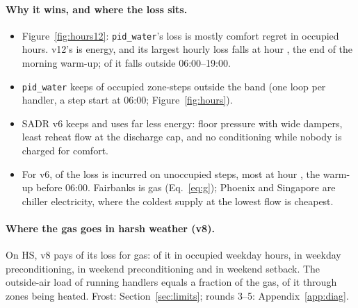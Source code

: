 \documentclass{article}
\begin{document}
\paragraph{Why it wins, and where the loss sits.}
\begin{itemize}
\item Figure~\ref{fig:hours12}: \texttt{pid\_water}'s loss is mostly comfort regret in occupied hours. v12's is energy, and its largest hourly loss falls at hour \RElvHourPeak{}, the end of the morning warm-up; \RElvUnoccHourShare{} of it falls outside 06:00--19:00.
\item \texttt{pid\_water} keeps \OccOutPidWater{} of occupied zone-steps outside the band (one loop per handler, a step start at 06:00; Figure~\ref{fig:hours}).
\item SADR v6 keeps \OccOutOurs{} and uses far less energy: floor pressure with wide dampers, least reheat flow at the discharge cap, and no conditioning while nobody is charged for comfort.
\item For v6, \UnoccShareOurs{} of the loss is incurred on unoccupied steps, most at hour \PeakLossHourOurs{}, the warm-up before 06:00. Fairbanks is gas (Eq.~\ref{eq:g}); Phoenix and Singapore are chiller electricity, where the coldest supply at the lowest flow is cheapest.
\end{itemize}

\paragraph{Where the gas goes in harsh weather (v8).} On HS, v8 pays \RSixDecGas{} of its loss for gas: \RSixDecOccWd{} of it in occupied weekday hours, \RSixDecPreWd{} in weekday preconditioning, \RSixDecPreWe{} in weekend preconditioning and \RSixDecSbWe{} in weekend setback. The outside-air load of running handlers equals a fraction \RSixDecVent{} of the gas, \RSixDecVentHeated{} of it through zones being heated. Frost: Section~\ref{sec:limits}; rounds 3--5: Appendix~\ref{app:diag}.
\end{document}
